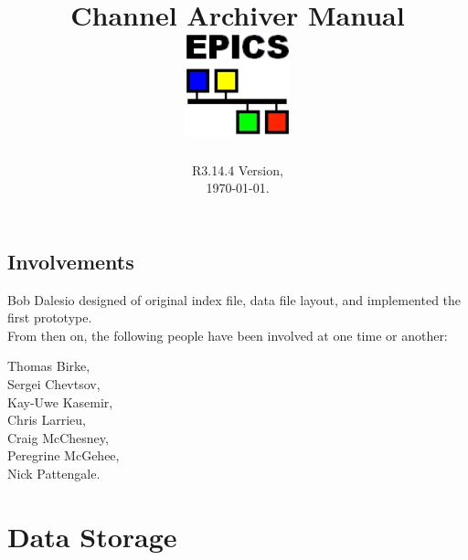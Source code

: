 \documentclass{report}
\begin{document}
\sffamily
\title{\Huge Channel Archiver Manual\\[1cm]
\includegraphics[width=3cm]{logo101}
}
\date{R3.14.4 Version,\\ \today.}
\maketitle
\newpage

\pagestyle{empty}
\section*{Involvements}
Bob Dalesio designed of original index file, data file layout,
and implemented the first prototype.\\
From then on, the following people have been involved at one
time or another:\\
\begin{center}
Thomas Birke,\\
Sergei Chevtsov,\\
Kay-Uwe Kasemir,\\ 
Chris Larrieu,\\
Craig McChesney,\\
Peregrine McGehee,\\
Nick Pattengale.
\end{center}
\newpage

\tableofcontents
\newpage
\pagestyle{headings}
\setcounter{page}{1}











\clearpage

\clearpage


\clearpage



\chapter{Data Storage} \label{chap:storage}


















\printindex
\end{document}
